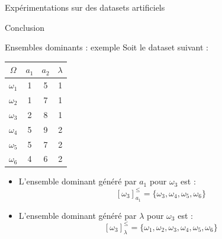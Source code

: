 \documentclass[usenames,dvipsnames]{beamer}
\begin{document}
\begin{frame}{Expérimentations sur des datasets artificiels}
\end{frame}

\begin{frame}{Conclusion}

\end{frame}

\begin{frame}[allowframebreaks]
  \printbibliography
\end{frame}

\begin{frame}
  \titlepage
\end{frame}


\begin{frame}{Ensembles dominants : exemple}
Soit le dataset suivant :

\begin{table}
\begin{tabular}{|*{3}{c|} | c |}
    \hline
        $\Omega$ & $a_1$ & $a_2$ & $\lambda$ \\
    \hline 
        $\omega_1$ & 1 & 5 & 1 \\ 
        $\omega_2$ & 1 & 7 & 1 \\
        $\omega_3$ & 2 & 8 & 1\\
        $\omega_4$ & 5 & 9 & 2 \\
        $\omega_5$ & 5 & 7 & 2 \\ 
        $\omega_6$ & 4  & 6 & 2\\
    \hline
\end{tabular}

\begin{itemize}
    \item L'ensemble dominant généré par $a_1$ pour $\omega_3$ est : 
        $$[\omega_3]^{\leq}_{a_1} = \{\omega_3, \omega_4, \omega_5, \omega_6\}$$
    \item L'ensemble dominant généré par $\lambda$ pour $\omega_3$ est :
        $$[\omega_3]^{\leq}_{\lambda} = \{\omega_1, \omega_2, \omega_3, \omega_4, \omega_5, \omega_6\}$$
\end{itemize}
\label{tab:dsa-dataset}
\end{table}
\end{frame}
\end{document}
